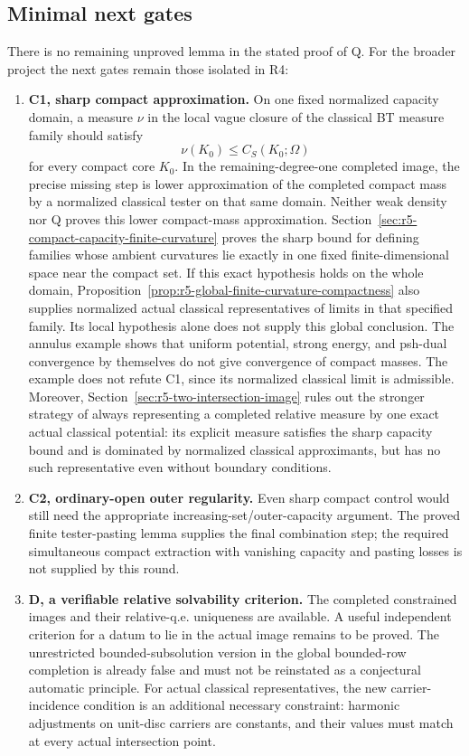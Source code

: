 \documentclass[11pt,a4paper]{article}
\numberwithin{equation}{section}
\theoremstyle{definition}
\theoremstyle{remark}
\begin{document}
\subsection{Minimal next gates}

There is no remaining unproved lemma in the stated proof of Q.
For the broader project the next gates remain those isolated
in R4:
\begin{enumerate}
\item \textbf{C1, sharp compact approximation.}
On one fixed normalized capacity domain, a measure $\nu$ in
the local vague closure of the classical BT measure family
should satisfy
\[
                    \nu(K_0)\leq C_S(K_0;\Omega)
\]
for every compact core $K_0$. In the remaining-degree-one
completed image, the precise missing step is lower
approximation of the completed compact mass by a normalized
classical tester on that same domain. Neither weak density
nor Q proves this lower compact-mass approximation.
Section~\ref{sec:r5-compact-capacity-finite-curvature} proves
the sharp bound for defining families whose ambient curvatures
lie exactly in one fixed finite-dimensional space near the
compact set. If this exact hypothesis holds on the whole domain,
Proposition~\ref{prop:r5-global-finite-curvature-compactness}
also supplies normalized actual classical representatives of
limits in that specified family. Its local hypothesis alone
does not supply this global conclusion.
The annulus example shows that uniform potential,
strong energy, and psh-dual convergence by themselves do not
give convergence of compact masses. The example does not
refute C1, since its normalized classical limit is admissible.
Moreover, Section~\ref{sec:r5-two-intersection-image} rules
out the stronger strategy of always representing a completed
relative measure by one exact actual classical potential:
its explicit measure satisfies the sharp capacity bound and
is dominated by normalized classical approximants, but has
no such representative even without boundary conditions.

\item \textbf{C2, ordinary-open outer regularity.}
Even sharp compact control would still need the appropriate
increasing-set/outer-capacity argument. The proved finite
tester-pasting lemma supplies the final combination step;
the required simultaneous compact extraction with vanishing
capacity and pasting losses is not supplied by this round.

\item \textbf{D, a verifiable relative solvability criterion.}
The completed constrained images and their relative-q.e.
uniqueness are available. A useful independent criterion for
a datum to lie in the actual image remains to be proved.
The unrestricted bounded-subsolution version in the global
bounded-row completion is already false and must not be
reinstated as a conjectural automatic principle.
For actual classical representatives, the new carrier-incidence
condition is an additional necessary constraint: harmonic
adjustments on unit-disc carriers are constants, and their
values must match at every actual intersection point.
\end{enumerate}
\end{document}
